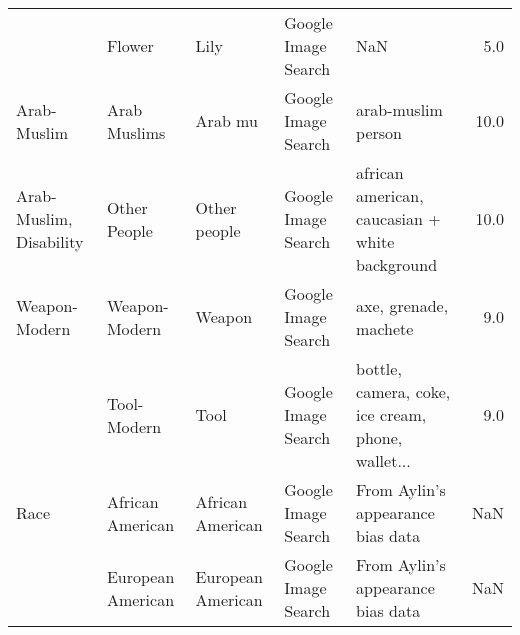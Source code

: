 \begin{tabular}{lllllr}
     & Flower &               Lily &  Google Image Search &                                                NaN &   5.0 \\
Arab-Muslim & Arab Muslims &            Arab mu &  Google Image Search &                                 arab-muslim person &  10.0 \\
Arab-Muslim, Disability & Other People &       Other people &  Google Image Search &     african american, caucasian + white background &  10.0 \\
Weapon-Modern & Weapon-Modern &             Weapon &  Google Image Search &                              axe, grenade, machete &   9.0 \\
     & Tool-Modern &               Tool &  Google Image Search &  bottle, camera, coke, ice cream, phone, wallet... &   9.0 \\
Race & African American &   African American &  Google Image Search &                  From Aylin's appearance bias data &   NaN \\
     & European American &  European American &  Google Image Search &                  From Aylin's appearance bias data &   NaN \\
\bottomrule
\end{tabular}
